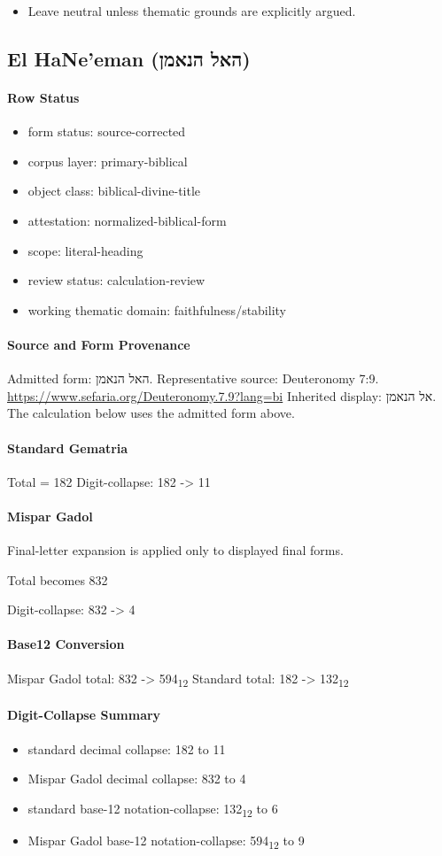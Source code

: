 \begin{itemize}
\item Leave neutral unless thematic grounds are explicitly argued.
\end{itemize}

\subsection{El HaNe’eman (האל הנאמן)}
\paragraph{Row Status}
\begin{itemize}
\item form status: source-corrected
\item corpus layer: primary-biblical
\item object class: biblical-divine-title
\item attestation: normalized-biblical-form
\item scope: literal-heading
\item review status: calculation-review
\item working thematic domain: faithfulness/stability
\end{itemize}
\paragraph{Source and Form Provenance}
Admitted form: האל הנאמן.
Representative source: Deuteronomy 7:9.
\url{https://www.sefaria.org/Deuteronomy.7.9?lang=bi}
Inherited display: אל הנאמן. The calculation below uses the admitted form above.
\paragraph{Standard Gematria}
Total = 182
Digit-collapse: 182 -> 11
\paragraph{Mispar Gadol}
Final-letter expansion is applied only to displayed final forms.

Total becomes 832

Digit-collapse: 832 -> 4
\paragraph{Base12 Conversion}
Mispar Gadol total: 832 -> 594\textsubscript{12}
Standard total: 182 -> 132\textsubscript{12}
\paragraph{Digit-Collapse Summary}
\begin{itemize}
\item standard decimal collapse: 182 to 11
\item Mispar Gadol decimal collapse: 832 to 4
\item standard base-12 notation-collapse: 132\textsubscript{12} to 6
\item Mispar Gadol base-12 notation-collapse: 594\textsubscript{12} to 9
\end{itemize}
